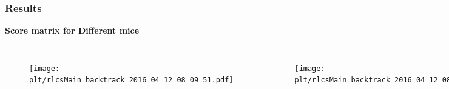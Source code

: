 \documentclass{beamer}
\newcommand{\plt}{../../plots}
\begin{document}
\begin{frame}
    \frametitle{Results}
    \textbf{Score matrix for Different mice}
    \begin{columns}[c]
    \begin{figure}
    \texttt{[image: \\plt/rlcsMain\_backtrack\_2016\_04\_12\_08\_09\_51.pdf]}
    \end{figure}
    \begin{figure}
    \texttt{[image: \\plt/rlcsMain\_backtrack\_2016\_04\_12\_08\_12\_31.pdf]}
    \end{figure}
    \end{columns}
\end{frame}
\end{document}
